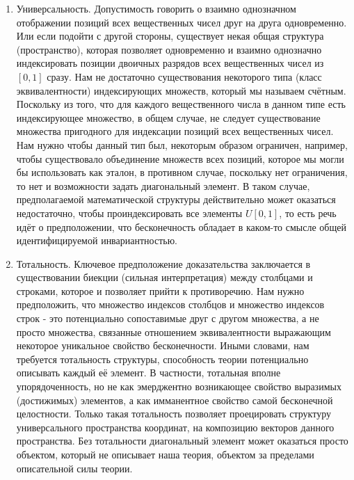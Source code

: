 \documentclass[12pt]{article}
\begin{document}
\begin{itemize}
\begin{enumerate}
    \item Универсальность. Допустимость говорить о взаимно однозначном отображении позиций всех вещественных чисел друг на друга одновременно. Или если подойти с другой стороны, существует некая общая структура (пространство), которая позволяет одновременно и взаимно однозначно индексировать позиции двоичных разрядов всех вещественных чисел из $[0, 1]$ сразу. Нам не достаточно существования некоторого типа (класс эквивалентности) индексирующих множеств, который мы называем счётным. Поскольку из того, что для каждого вещественного числа в данном типе есть индексирующее множество, в общем случае, не следует существование множества пригодного для индексации позиций всех вещественных чисел. Нам нужно чтобы данный тип был, некоторым образом ограничен, например, чтобы существовало объединение множеств всех позиций, которое мы могли бы использовать как эталон, в противном случае, поскольку нет ограничения, то нет и возможности задать диагональный элемент. В таком случае, предполагаемой математической структуры действительно может оказаться недостаточно, чтобы проиндексировать все элементы $U[0, 1]$, то есть речь идёт о предположении, что бесконечность обладает в каком-то смысле общей идентифицируемой инвариантностью.
    \item Тотальность. Ключевое предположение доказательства заключается в существовании биекции (сильная интерпретация) между столбцами и строками, которое и позволяет прийти к противоречию. Нам нужно предположить, что множество индексов столбцов и множество индексов строк - это потенциально сопоставимые друг с другом множества, а не просто множества, связанные отношением эквивалентности выражающим некоторое уникальное свойство бесконечности. Иными словами, нам требуется тотальность структуры, способность теории потенциально описывать каждый её элемент. В частности, тотальная вполне упорядоченность, но не как эмерджентно возникающее свойство выразимых (достижимых) элементов, а как имманентное свойство самой бесконечной целостности. Только такая тотальность позволяет проецировать структуру универсального пространства координат, на композицию векторов данного пространства. Без тотальности диагональный элемент может оказаться просто объектом, который не описывает наша теория, объектом за пределами описательной силы теории.
\end{enumerate}
\end{itemize}
\end{document}
